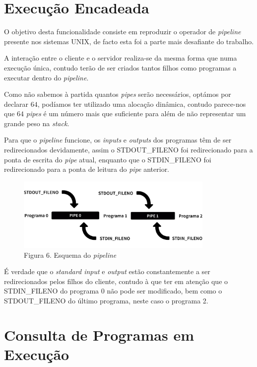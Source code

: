 \documentclass[12pt,a4paper]{report}
\begin{document}
    \section{Execução Encadeada}

        O objetivo desta funcionalidade consiste em reproduzir o operador de \textit{pipeline} presente nos sistemas UNIX, de facto esta foi a parte mais desafiante do trabalho.

        A interação entre o cliente e o servidor realiza-se da mesma forma que numa execução única, contudo terão de ser criados tantos filhos como programas a executar dentro do \textit{pipeline}.

        Como não sabemos à partida quantos \textit{pipes} serão necessários, optámos por declarar $64$, podíamos ter utilizado uma alocação dinâmica, contudo parece-nos que $64$ \textit{pipes} é um número mais que suficiente para além de não representar um grande peso na \textit{stack}.

        Para que o \textit{pipeline} funcione, os \textit{inputs} e \textit{outputs} dos programas têm de ser redirecionados devidamente, assim o STDOUT\_FILENO foi redirecionado para a ponta de escrita do \textit{pipe} atual, enquanto que o STDIN\_FILENO foi redirecionado para a ponta de leitura do \textit{pipe} anterior.

        \begin{figure}[hb!]
            \centering
            \includegraphics[width=0.85\textwidth]{images/pipeline.png}
            \caption*{Figura 6. Esquema do \textit{pipeline}}
            \label{fig:PIPE}
        \end{figure}

        É verdade que o \textit{standard input} e \textit{output} estão constantemente a ser redirecionados pelos filhos do cliente, contudo à que ter em atenção que o STDIN\_FILENO do programa $0$ não pode ser modificado, bem como o STDOUT\_FILENO do último programa, neste caso o programa 2.

    \section{Consulta de Programas em Execução}
\end{document}
